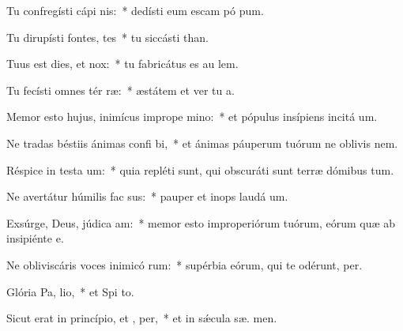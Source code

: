\item Tu confregísti cápi nis:~* dedísti eum escam pó pum.
\item Tu dirupísti fontes,  tes~* tu siccásti  than.
\item Tuus est dies, et   nox:~* tu fabricátus es au  lem.
\item Tu fecísti omnes tér ræ:~* æstátem et ver tu  a.
\item Memor esto hujus, inimícus imprope mino:~* et pópulus insípiens incitá  um.
\item Ne tradas béstiis ánimas confi bi,~* et ánimas páuperum tuórum ne oblivis  nem.
\item Réspice in testa um:~* quia repléti sunt, qui obscuráti sunt terræ dómibus tum.
\item Ne avertátur húmilis fac sus:~* pauper et inops laudá  um.
\item Exsúrge, Deus, júdica  am:~* memor esto improperiórum tuórum, eórum quæ ab insipiénte   e.
\item Ne obliviscáris voces inimicó rum:~* supérbia eórum, qui te odérunt,  per.
\item Glória Pa,  lio,~* et Spi to.
\item Sicut erat in princípio, et ,  per,~* et in sǽcula sæ. men.
